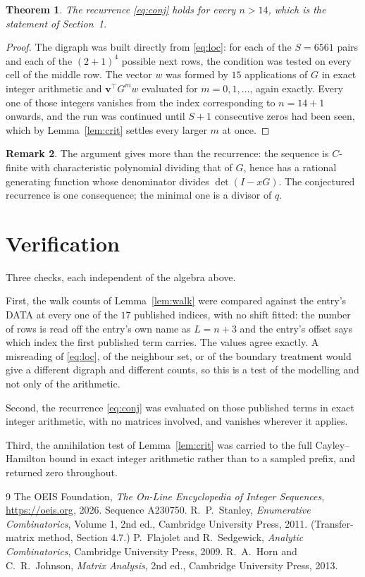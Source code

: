 \documentclass[11pt,a4paper]{article}
\theoremstyle{plain}
\newtheorem{theorem}{Theorem}
\theoremstyle{definition}
\newtheorem{remark}[theorem]{Remark}
\begin{document}
\begin{theorem}
The recurrence \eqref{eq:conj} holds for every $n>14$, which is the statement of
Section~1.
\end{theorem}

\begin{proof}
The digraph was built directly from \eqref{eq:loc}: for each of the $S=6561$ pairs and each
of the $(2+1)^{4}$ possible next rows, the condition was tested on every cell of
the middle row. The vector $w$ was formed by $15$ applications of $G$ in exact integer
arithmetic and $\mathbf{v}^{\!\top}G^{m}w$ evaluated for $m=0,1,\dots$, again exactly.
Every one of those integers vanishes from the index corresponding to $n=14+1$ onwards,
and the run was continued until $S+1$ consecutive zeros had been seen, which by
Lemma~\ref{lem:crit} settles every larger $m$ at once.
\end{proof}

\begin{remark}
The argument gives more than the recurrence: the sequence is $C$-finite with characteristic
polynomial dividing that of $G$, hence has a rational generating function whose denominator
divides $\det(I-xG)$. The conjectured recurrence is one consequence; the minimal one is a
divisor of $q$.
\end{remark}

\section{Verification}

Three checks, each independent of the algebra above.

First, the walk counts of Lemma~\ref{lem:walk} were compared against the entry's DATA at
every one of the $17$ published indices, with no shift fitted: the number of rows is
read off the entry's own name as $L=n+3$ and the entry's offset says which index the first
published term carries. The values agree exactly. A misreading of \eqref{eq:loc}, of the
neighbour set, or of the boundary treatment would give a different digraph and different
counts, so this is a test of the modelling and not only of the arithmetic.

Second, the recurrence \eqref{eq:conj} was evaluated on those published terms in exact
integer arithmetic, with no matrices involved, and vanishes wherever it applies.

Third, the annihilation test of Lemma~\ref{lem:crit} was carried to the full
Cayley--Hamilton bound in exact integer arithmetic rather than to a sampled prefix, and
returned zero throughout.

\begin{thebibliography}{9}
 The OEIS Foundation, \emph{The On-Line Encyclopedia of Integer
Sequences}, \url{https://oeis.org}, 2026. Sequence A230750.
 R.~P.~Stanley, \emph{Enumerative Combinatorics}, Volume 1, 2nd ed.,
Cambridge University Press, 2011. (Transfer-matrix method, Section 4.7.)
 P.~Flajolet and R.~Sedgewick, \emph{Analytic Combinatorics}, Cambridge
University Press, 2009.
 R.~A.~Horn and C.~R.~Johnson, \emph{Matrix Analysis}, 2nd ed., Cambridge
University Press, 2013.
\end{thebibliography}
\end{document}
